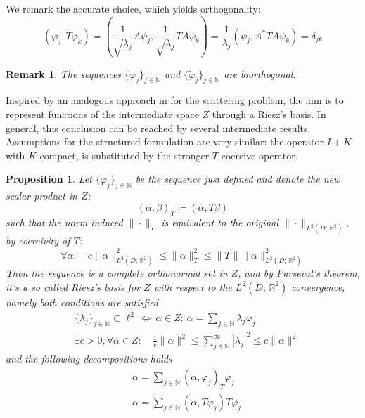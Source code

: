 \documentclass[10pt, a4paper, twoside, openright]{book}
\theoremstyle{definition}
\theoremstyle{plain}
\theoremstyle{plain}
\theoremstyle{plain}
\newtheorem{proposition}[subsection]{Proposition}
\theoremstyle{plain}
\newtheorem{remark}[subsection]{Remark}
\theoremstyle{plain}
\theoremstyle{plain}
\theoremstyle{plain}
\theoremstyle{plain}
\let\phi\varphi
\begin{document}
We remark the accurate choice, which yields orthogonality:
\begin{equation}
 (\phi_j, T\phi_k) =  ( \frac{1}{\sqrt{\lambda_j}} A\psi_j, \frac{1}{\sqrt{\lambda_j}} TA\psi_k) = \frac{1}{\lambda_j}( \psi_j, A^*TA\psi_k) = \delta_{jk}
\end{equation}
\begin{remark}
 The sequences $\{\phi_j\}_{j\in\mathbb{N}}$ and $\{\tilde{\phi}_j\}_{j\in\mathbb{N}}$ are biorthogonal.
\end{remark}
Inspired by an analogous approach in \cite{kirsch:shape-1998} for the scattering problem, the aim is to represent functions of the intermediate space $Z$ through a Riesz's basis.
In general, this conclusion can be reached by several intermediate results. Assumptions for the structured formulation are very similar: the operator $I+K$ with $K$ compact, is substituted by the stronger $T$ coercive operator.
\begin{proposition}
 Let $\{\phi_j\}_{j\in\mathbb{N}}$ be the sequence just defined and denote the new scalar product in $Z$:
 \begin{equation}
   ( \alpha, \beta )_T \coloneqq ( \alpha , T\beta)   
 \end{equation}
 such that the norm induced $\|\cdot\|_T$ is equivalent to the original $\|\cdot\|_{L^2(D;\,\mathbb{R}^2)}$, by coercivity of $T$: 
  \begin{equation}
   \forall \alpha:\quad c\|\alpha\|_{L^2(D;\,\mathbb{R}^2)}^2\leq \|\alpha\|_T^2 \leq \|T\|\|\alpha\|_{L^2(D;\,\mathbb{R}^2)}^2
  \end{equation}
 Then the sequence is a complete orthonormal set in $Z$, and by Parseval's theorem, it's a so called Riesz's basis for $Z$ with respect to the $L^2(D;\,\mathbb{R}^2)$ convergence, namely both conditions are satisfied
 \begin{align}
 &\{\lambda_j\}_{j \in \mathbb{N}} \subset \ell^2 \,\Leftrightarrow \,\alpha \in Z:\,\alpha = \sum_{j \in \mathbb{N}}\lambda_j \phi_j \\
 & \exists c>0, \forall \alpha \in Z: \quad \frac{1}{c}\|\alpha\|^2 \leq \sum_{j\in\mathbb{N}}^\infty|\lambda_j|^2  \leq c \|\alpha\|^2
 \end{align}
 and the following decompositions holds
 \begin{align}
  & \alpha = \sum_{j \in \mathbb{N}}(\alpha,\phi_j)_T \phi_j  \\
  & \alpha = \sum_{j \in \mathbb{N}}(\alpha,T\phi_j) T\phi_j  
 \end{align}
\end{proposition}
\end{document}

